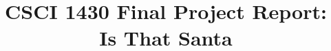 %
%
%

%
%
%
%
% 
%
%
% 

\documentclass[10pt,twocolumn,letterpaper]{article}
 
\usepackage{cvpr}
\usepackage{times}
\usepackage{epsfig}
\usepackage{graphicx}
\usepackage{amsmath}
\usepackage{amssymb}
\usepackage{booktabs}
\usepackage{microtype}
\usepackage[numbered,framed]{matlab-prettifier}

\frenchspacing


\usepackage[pagebackref=true,breaklinks=true,letterpaper=true,colorlinks,bookmarks=false]{hyperref}

\cvprfinalcopy
\def\cvprPaperID{****}
\def\httilde{\mbox{\tt\raisebox{-.5ex}{\symbol{126}}}}
\ifcvprfinal\pagestyle{empty}\fi



\title{CSCI 1430 Final Project Report:\\Is That Santa}


